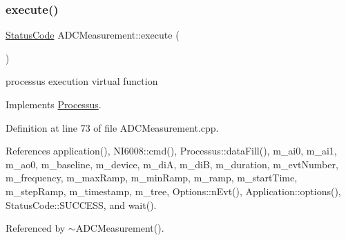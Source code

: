 \subsubsection{\texorpdfstring{execute()}{execute()}}
{\footnotesize\ttfamily \hyperlink{classStatusCode}{Status\+Code} A\+D\+C\+Measurement\+::execute (\begin{DoxyParamCaption}{ }\end{DoxyParamCaption})\hspace{0.3cm}{\ttfamily [virtual]}}

processus execution virtual function 

Implements \hyperlink{classProcessus_a63767a63a1fb0055c5aa45b21a4a5d58}{Processus}.



Definition at line 73 of file A\+D\+C\+Measurement.\+cpp.



References application(), N\+I6008\+::cmd(), Processus\+::data\+Fill(), m\+\_\+ai0, m\+\_\+ai1, m\+\_\+ao0, m\+\_\+baseline, m\+\_\+device, m\+\_\+diA, m\+\_\+diB, m\+\_\+duration, m\+\_\+evt\+Number, m\+\_\+frequency, m\+\_\+max\+Ramp, m\+\_\+min\+Ramp, m\+\_\+ramp, m\+\_\+start\+Time, m\+\_\+step\+Ramp, m\+\_\+timestamp, m\+\_\+tree, Options\+::n\+Evt(), Application\+::options(), Status\+Code\+::\+S\+U\+C\+C\+E\+SS, and wait().



Referenced by $\sim$\+A\+D\+C\+Measurement().


